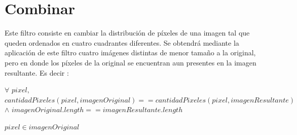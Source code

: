 \section{Combinar}
Este filtro consiste en cambiar la distribución de píxeles de una imagen tal que queden ordenados en cuatro cuadrantes diferentes. Se obtendrá mediante la aplicación de este filtro cuatro imágenes distintas de menor tamaño a la original, pero en donde los píxeles de la original se encuentran aun presentes en la imagen resultante. Es decir : 
\begin{center}
$\forall$ $pixel,$ $cantidadPixeles(pixel, imagenOriginal) == cantidadPixeles(pixel,imagenResultante)$ 
$\wedge$ $imagenOriginal.length == imagenResultante.length$ 
\end{center}
\begin{flushright}
 $pixel \in imagenOriginal$
\end{flushright}

